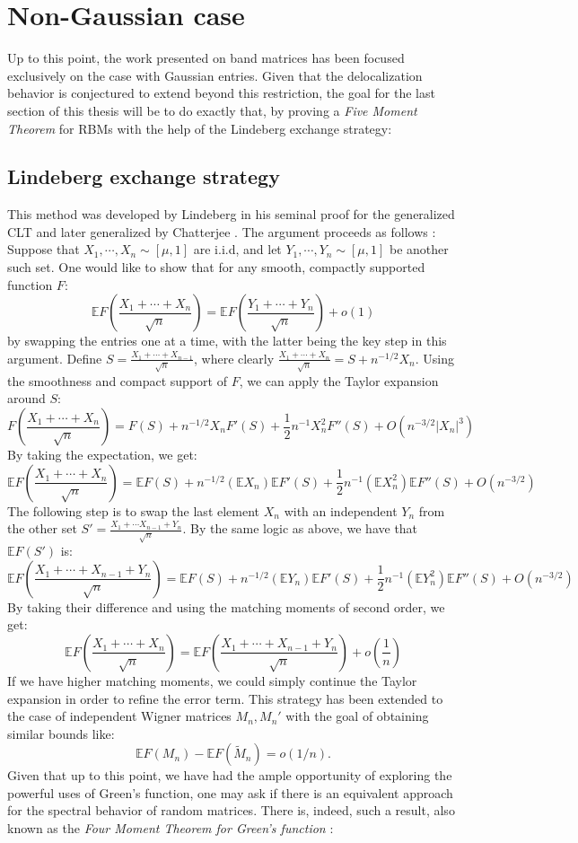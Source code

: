 \documentclass[11pt]{article}
\begin{document}
\newpage

\section{Non-Gaussian case}
\label{sec:non-gaussian}
Up to this point, the work presented on band matrices has been focused exclusively on the case with Gaussian entries. Given that the delocalization behavior is conjectured to extend beyond this restriction, the goal for the last section of this thesis will be to do exactly that, by proving a \textit{Five Moment Theorem} for RBMs with the help of the Lindeberg exchange strategy:


\subsection{Lindeberg exchange strategy}
This method was developed by Lindeberg in his seminal proof for the generalized CLT \cite{lindeberg} and later generalized by Chatterjee \cite{chatterjee}. The argument proceeds as follows \cite{tao}: Suppose that $X_1, \cdots, X_n\sim [\mu, 1]$ are i.i.d, and let $Y_1, \cdots, Y_n\sim[\mu, 1]$ be another such set. One would like to show that for any smooth, compactly supported function $F$: $$\mathbb{E}F\left(\frac{X_1+\cdots+X_n}{\sqrt{n}}\right) = \mathbb{E}F\left(\frac{Y_1+\cdots+Y_n}{\sqrt{n}}\right)+o(1)$$
by swapping the entries one at a time, with the latter being the key step in this argument.  Define
$S= \frac{X_1+\cdots+X_{n-1}}{\sqrt{n}}$, where clearly $ \frac{X_1+\cdots+X_n}{\sqrt{n}}=S+n^{-1/2}X_n $. Using the smoothness and compact support of $F$, we can apply the Taylor expansion around $S$: $$F\left(\frac{X_1+\cdots+X_n}{\sqrt{n}}\right)=F(S)+n^{-1/2}X_nF'(S)+\frac{1}{2}n^{-1}X_n^2 F''(S) + O(n^{-3/2}|X_n|^3)$$
By taking the expectation, we get: 
$$ \mathbb{E}F\left(\frac{X_1+\cdots+X_n}{\sqrt{n}}\right)=\mathbb{E}F(S)+n^{-1/2}(\mathbb{E}X_n)\mathbb{E}F'(S)+\frac{1}{2}n^{-1}(\mathbb{E}X_n^2)\mathbb{E}F''(S) + O(n^{-3/2})$$
The following step is to swap the last element $X_n$ with an independent $Y_n$ from the other set $S' = \frac{X_1+\cdots X_{n-1}+Y_n}{\sqrt{n}}$. By the same logic as above, we have that $\mathbb{E}F(S')$ is: 
$$ \mathbb{E}F\left(\frac{X_1+\cdots+X_{n-1}+Y_n}{\sqrt{n}}\right)=\mathbb{E}F(S)+n^{-1/2}(\mathbb{E}Y_n)\mathbb{E}F'(S)+\frac{1}{2}n^{-1}(\mathbb{E}Y_n^2)\mathbb{E}F''(S) +O (n^{-3/2})$$
By taking their difference and using the matching moments of second order, we get: 
$$ \mathbb{E}F\left(\frac{X_1+\cdots+X_n}{\sqrt{n}}\right) = \mathbb{E}F\left(\frac{X_1+\cdots+X_{n-1}+Y_n}{\sqrt{n}}\right)+o\left(\frac{1}{n}\right)$$
If we have higher matching moments, we could simply continue the Taylor expansion in order to refine the error term.
This strategy has been extended to the case of independent Wigner matrices $M_n, M_n'$ with the goal of obtaining similar bounds like: $$\mathbb{E}F(M_n)-\mathbb{E}F(\tilde{M}_n)=o(1/n).$$ 
\noindent Given that up to this point, we have had the ample opportunity of exploring the powerful uses of Green's function, one may ask if there is an equivalent approach for the spectral behavior of random matrices. There is, indeed, such a result, also known as the \textit{Four Moment Theorem for Green's function} \cite{tao2}:
\end{document}
